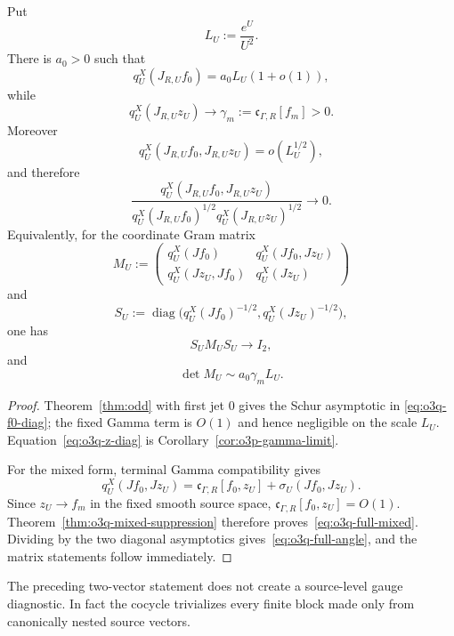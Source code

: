 \begin{corollary}\label{cor:o3q-full-angle}
Put
\[
 L_U:=\frac{e^U}{U^2}.
\]
There is $a_0>0$ such that
\[
 q_U^X(J_{R,U}f_0)=a_0L_U(1+o(1)),
\tag{O3Q.2}\label{eq:o3q-f0-diag}
\]
while
\[
 q_U^X(J_{R,U}z_U)
 \longrightarrow
 \gamma_m:=\mathfrak c_{\Gamma,R}[f_m]>0.
\tag{O3Q.3}\label{eq:o3q-z-diag}
\]
Moreover
\[
 q_U^X(J_{R,U}f_0,J_{R,U}z_U)=o(L_U^{1/2}),
\tag{O3Q.4}\label{eq:o3q-full-mixed}
\]
and therefore
\[
 \boxed{
 \frac{q_U^X(J_{R,U}f_0,J_{R,U}z_U)}
 {q_U^X(J_{R,U}f_0)^{1/2}
  q_U^X(J_{R,U}z_U)^{1/2}}
 \longrightarrow0.
 }
\tag{O3Q.5}\label{eq:o3q-full-angle}
\]
Equivalently, for the coordinate Gram matrix
\[
 M_U:=
 \begin{pmatrix}
 q_U^X(Jf_0) & q_U^X(Jf_0,Jz_U)\\
 q_U^X(Jz_U,Jf_0) & q_U^X(Jz_U)
 \end{pmatrix}
\]
and
\[
 S_U:=\operatorname{diag}
 \bigl(q_U^X(Jf_0)^{-1/2},q_U^X(Jz_U)^{-1/2}\bigr),
\]
one has
\[
 \boxed{S_UM_US_U\to I_2,}
\tag{O3Q.6}\label{eq:o3q-correlation-matrix}
\]
and
\[
 \boxed{\det M_U\sim a_0\gamma_mL_U.}
\tag{O3Q.7}\label{eq:o3q-det}
\]
\end{corollary}

\begin{proof}
Theorem~\ref{thm:odd} with first jet $0$ gives the Schur asymptotic in
\eqref{eq:o3q-f0-diag}; the fixed Gamma term is $O(1)$ and hence negligible on the
scale $L_U$.  Equation~\eqref{eq:o3q-z-diag} is
Corollary~\ref{cor:o3p-gamma-limit}.

For the mixed form, terminal Gamma compatibility gives
\[
 q_U^X(Jf_0,Jz_U)
 =\mathfrak c_{\Gamma,R}[f_0,z_U]
  +\sigma_U(Jf_0,Jz_U).
\]
Since $z_U\to f_m$ in the fixed smooth source space,
$\mathfrak c_{\Gamma,R}[f_0,z_U]=O(1)$.  Theorem~\ref{thm:o3q-mixed-suppression}
therefore proves~\eqref{eq:o3q-full-mixed}.  Dividing by the two diagonal asymptotics
gives~\eqref{eq:o3q-full-angle}, and the matrix statements follow immediately.
\end{proof}

The preceding two-vector statement does not create a source-level gauge diagnostic.
In fact the cocycle trivializes every finite block made only from canonically nested
source vectors.

